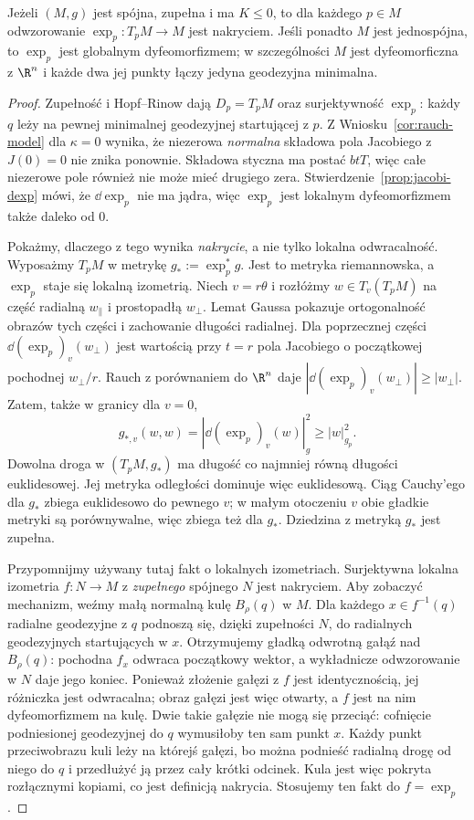 \begin{twierdzenie}
\label{thm:cartan-hadamard}
Jeżeli $(M,g)$ jest spójna, zupełna i ma
$K\leq0$, to dla każdego $p\in M$
odwzorowanie
$\exp_p:T_pM\to M$ jest nakryciem.
Jeśli ponadto $M$ jest jednospójna, to
$\exp_p$ jest globalnym dyfeomorfizmem;
w szczególności $M$ jest dyfeomorficzna
z $\R^n$ i każde dwa jej punkty łączy
jedyna geodezyjna minimalna.
\end{twierdzenie}
\begin{proof}
Zupełność i Hopf--Rinow dają
$D_p=T_pM$ oraz surjektywność $\exp_p$:
każdy $q$ leży na pewnej minimalnej
geodezyjnej startującej z $p$.
Z Wniosku~\ref{cor:rauch-model} dla $\kappa=0$
wynika, że niezerowa \emph{normalna} składowa
pola Jacobiego z $J(0)=0$ nie znika ponownie.
Składowa styczna ma postać $btT$, więc całe
niezerowe pole również nie może mieć drugiego zera.
Stwierdzenie~\ref{prop:jacobi-dexp} mówi,
że $\dd\exp_p$ nie ma jądra, więc $\exp_p$
jest lokalnym dyfeomorfizmem także daleko od $0$.

Pokażmy, dlaczego z tego wynika \emph{nakrycie},
a nie tylko lokalna odwracalność.
Wyposażmy $T_pM$ w metrykę $g_*:=\exp_p^*g$.
Jest to metryka riemannowska, a $\exp_p$
staje się lokalną izometrią. Niech $v=r\theta$
i rozłóżmy $w\in T_v(T_pM)$ na część radialną
$w_\parallel$ i prostopadłą $w_\perp$.
Lemat Gaussa pokazuje ortogonalność obrazów
tych części i zachowanie długości radialnej.
Dla poprzecznej części
$\dd(\exp_p)_v(w_\perp)$ jest wartością
przy $t=r$ pola Jacobiego o początkowej
pochodnej $w_\perp/r$. Rauch z porównaniem
do $\R^n$ daje
$|\dd(\exp_p)_v(w_\perp)|\geq|w_\perp|$.
Zatem, także w granicy dla $v=0$,
\begin{equation}\label{eq:hadamard-exp-rozszerza}
 g_{*,v}(w,w)=|\dd(\exp_p)_v(w)|_g^2
 \geq |w|_{g_p}^2.
\end{equation}
Dowolna droga w $(T_pM,g_*)$ ma długość
co najmniej równą długości euklidesowej.
Jej metryka odległości dominuje więc
euklidesową. Ciąg Cauchy'ego dla $g_*$
zbiega euklidesowo do pewnego $v$;
w małym otoczeniu $v$ obie gładkie metryki
są porównywalne, więc zbiega też dla $g_*$.
Dziedzina z metryką $g_*$ jest zupełna.

Przypomnijmy używany tutaj fakt o lokalnych
izometriach. Surjektywna lokalna izometria
$f:N\to M$ z \emph{zupełnego} spójnego $N$
jest nakryciem. Aby zobaczyć mechanizm,
weźmy małą normalną kulę $B_\rho(q)$ w $M$.
Dla każdego $x\in f^{-1}(q)$ radialne geodezyjne
z $q$ podnoszą się, dzięki zupełności $N$,
do radialnych geodezyjnych startujących w $x$.
Otrzymujemy gładką odwrotną gałąź nad
$B_\rho(q)$: pochodna $f_x$ odwraca
początkowy wektor, a wykładnicze odwzorowanie
w $N$ daje jego koniec. Ponieważ złożenie gałęzi z $f$
jest identycznością, jej różniczka jest odwracalna;
obraz gałęzi jest więc otwarty, a $f$ jest na nim
dyfeomorfizmem na kulę. Dwie takie gałęzie
nie mogą się przeciąć: cofnięcie podniesionej
geodezyjnej do $q$ wymusiłoby ten sam punkt $x$.
Każdy punkt przeciwobrazu kuli leży na którejś
gałęzi, bo można podnieść radialną drogę
od niego do $q$ i przedłużyć ją przez cały
krótki odcinek. Kula jest więc pokryta
rozłącznymi kopiami, co jest definicją nakrycia.
Stosujemy ten fakt do $f=\exp_p$.


\end{proof}
